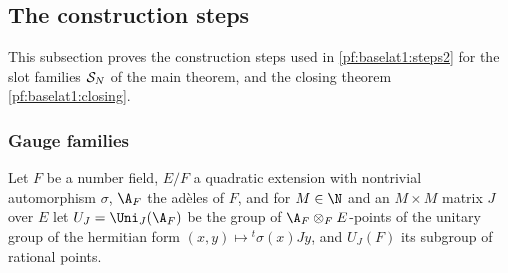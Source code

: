 \subsection{The construction steps}\label{pf:baselat1:ssec:stages}

This subsection proves the construction steps used in \cref{pf:baselat1:steps2} for the slot families
$\mathcal S_N$ of the main theorem, and the closing theorem \cref{pf:baselat1:closing}.

\subsubsection{Gauge families}

Let $F$ be a number field, $E/F$ a quadratic extension with nontrivial automorphism $\sigma$, $\A_F$ the
ad\`eles of $F$, and for $M\in\N$ and an $M\times M$ matrix $J$ over $E$ let $U_J=\Uni_J(\A_F)$ be the group
of $\A_F\otimes_FE$-points of the unitary group of the hermitian form $(x,y)\mapsto{}^t\!\sigma(x)Jy$, and
$U_J(F)$ its subgroup of rational points.

